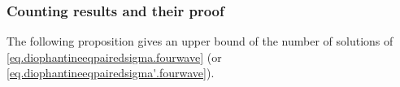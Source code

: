 











\subsubsection{Counting results and their proof}
The following proposition gives an upper bound of the number of solutions of \eqref{eq.diophantineeqpairedsigma.fourwave} (or \eqref{eq.diophantineeqpairedsigma'.fourwave}).

